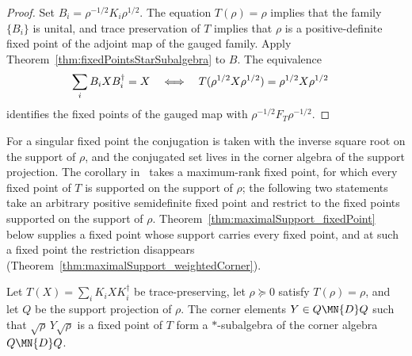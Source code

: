 \begin{proof}
    \leanok
    Set $B_i=\rho^{-1/2}K_i\rho^{1/2}$. The equation $T(\rho)=\rho$
    implies that the family $\{B_i\}$ is unital, and trace preservation of
    $T$ implies that $\rho$ is a positive-definite fixed point of the
    adjoint map of the gauged family. Apply
    Theorem~\ref{thm:fixedPointsStarSubalgebra} to $B$. The equivalence
    \begin{align}
        \sum_iB_iXB_i^\dagger=X
         & \quad\Longleftrightarrow\quad
        T(\rho^{1/2}X\rho^{1/2})=\rho^{1/2}X\rho^{1/2}
        \notag
    \end{align}
    identifies the fixed points of the gauged map with
    $\rho^{-1/2}F_T\rho^{-1/2}$.
\end{proof}

For a singular fixed point the conjugation is taken with the inverse square
root on the support of $\rho$, and the conjugated set lives in the corner
algebra of the support projection. The corollary in~\cite{Wolf2012Quantum}
takes a maximum-rank fixed point, for which every fixed point of $T$ is
supported on the support of $\rho$; the following two statements take an
arbitrary positive semidefinite fixed point and restrict to the fixed points
supported on the support of $\rho$.
Theorem~\ref{thm:maximalSupport_fixedPoint} below supplies a fixed point
whose support carries every fixed point, and at such a fixed point the
restriction disappears
(Theorem~\ref{thm:maximalSupport_weightedCorner}).

\begin{theorem}%
    \label{thm:weightedCornerFixedPointsStarSubalgebra}
    \leanok
    Let $T(X)=\sum_iK_iXK_i^\dagger$ be trace-preserving, let
    $\rho\succeq0$ satisfy $T(\rho)=\rho$, and let $Q$ be the support
    projection of $\rho$. The corner elements $Y\in Q\MN{D}Q$ such that
    $\sqrt{\rho}\,Y\sqrt{\rho}$ is a fixed point of $T$ form a
    $*$-subalgebra of the corner algebra $Q\MN{D}Q$.
\end{theorem}

